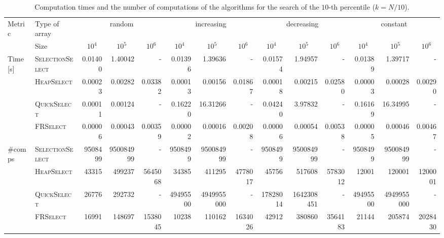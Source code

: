 \documentclass[acmconf,nonacm=true]{acmart}
\begin{document}
\begin{table}[h!]
    \centering
    \scriptsize
    \caption{Computation times and the number of computations of the algorithms for the search of the $10$-th percentile ($k=N/10$).}
    \label{table:k-0.1N}
    \begin{tabular}{llrrrrrrrrrrrr}
        \toprule
        {Metric} & {Type of array} & \multicolumn{3}{c}{{random}} & \multicolumn{3}{c}{{increasing}} & \multicolumn{3}{c}{{decreasing}} & \multicolumn{3}{c}{{constant}} \\
        \cmidrule(r){3-5} \cmidrule(lr){6-8} \cmidrule(lr){9-11} \cmidrule(l){12-14}
        & {Size} & \multicolumn{1}{c}{$10^4$} & \multicolumn{1}{c}{$10^5$} & \multicolumn{1}{c}{$10^6$} & \multicolumn{1}{c}{$10^4$} & \multicolumn{1}{c}{$10^5$} & \multicolumn{1}{c}{$10^6$} & \multicolumn{1}{c}{$10^4$} & \multicolumn{1}{c}{$10^5$} & \multicolumn{1}{c}{$10^6$} & \multicolumn{1}{c}{$10^4$} & \multicolumn{1}{c}{$10^5$} & \multicolumn{1}{c}{$10^6$} \\
        \midrule 
        Time [s] & \textsc{SelectionSelect} & 0.01400 & 1.40042 & - & 0.01396 & 1.39636 & - & 0.01574 & 1.94957 & - & 0.01389 & 1.39717 & - \\
        & \textsc{HeapSelect} & 0.00023 & 0.00282 & 0.03382 & 0.00013 & 0.00156 & 0.01867 & 0.00018 & 0.00215 & 0.02580 & 0.00003 & 0.00028 & 0.00290 \\
        & \textsc{QuickSelect} & 0.00011 & 0.00124 & - & 0.16220 & 16.31266 & - & 0.04240 & 3.97832 & - & 0.16169 & 16.34995 & - \\
        & \textsc{FRSelect} & 0.00006 & 0.00043 & 0.00359 & 0.00002 & 0.00016 & 0.00208 & 0.00006 & 0.00054 & 0.00538 & 0.00005 & 0.00046 & 0.00467 \\
        \midrule
        \#comps & \textsc{SelectionSelect} & 9508499 & 950084999 & - & 9508499 & 950084999 & - & 9508499 & 950084999 & - & 9508499 & 950084999 & - \\
        & \textsc{HeapSelect} & 43315 & 499237 & 5645068 & 34385 & 411295 & 4778017 & 45756 & 517608 & 5783012 & 12001 & 120001 & 1200001 \\
        & \textsc{QuickSelect} & 26776 & 292732 & - & 49495500 & 4949955000 & - & 17828014 & 1642308451 & - & 49495500 & 4949955000 & - \\
        & \textsc{FRSelect} & 16991 & 148697 & 1538045 & 10238 & 110162 & 1634026 & 42912 & 380860 & 3564183 & 21144 & 205874 & 2028430 \\
        \bottomrule
    \end{tabular}
\end{table}
\end{document}
